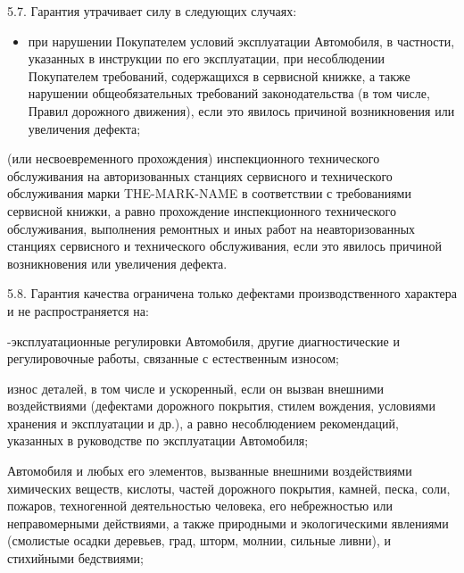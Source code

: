 \documentclass[a4paper,12pt]{article}
\begin{document}
\begin{description}\item5.7. Гарантия утрачивает силу в следующих случаях:\end{description}
 \begin{itemize}\item при нарушении Покупателем условий эксплуатации Автомобиля, в частности, указанных в инструкции по его эксплуатации, при несоблюдении Покупателем требований, содержащихся в сервисной книжке, а также нарушении общеобязательных требований законодательства (в том числе, Правил дорожного движения), если это явилось причиной возникновения или увеличения дефекта;\end{itemize}
 \begin{itemize} (или несвоевременного прохождения) инспекционного технического обслуживания на авторизованных станциях сервисного и технического обслуживания марки  THE-MARK-NAME в соответствии с требованиями сервисной книжки, а равно прохождение инспекционного технического обслуживания, выполнения ремонтных и иных работ на неавторизованных станциях сервисного и технического обслуживания, если это явилось причиной возникновения или увеличения дефекта.\end{itemize}
\begin{description}\item5.8. Гарантия качества ограничена только дефектами производственного характера и не распространяется на:\end{description}
 \begin{itemize}-эксплуатационные регулировки Автомобиля, другие диагностические и регулировочные работы, связанные с естественным износом;\end{itemize}
 \begin{itemize} износ деталей, в том числе и ускоренный, если он вызван внешними воздействиями (дефектами дорожного покрытия, стилем вождения, условиями хранения и эксплуатации и др.), а равно несоблюдением рекомендаций, указанных в руководстве по эксплуатации Автомобиля;\end{itemize}
 \begin{itemize} Автомобиля и любых его элементов, вызванные внешними воздействиями химических веществ, кислоты, частей дорожного покрытия, камней, песка, соли, пожаров, техногенной деятельностью человека, его небрежностью или неправомерными действиями, а также природными и экологическими явлениями (смолистые осадки деревьев, град, шторм, молнии, сильные ливни), и стихийными бедствиями;\end{itemize}
\end{document}

